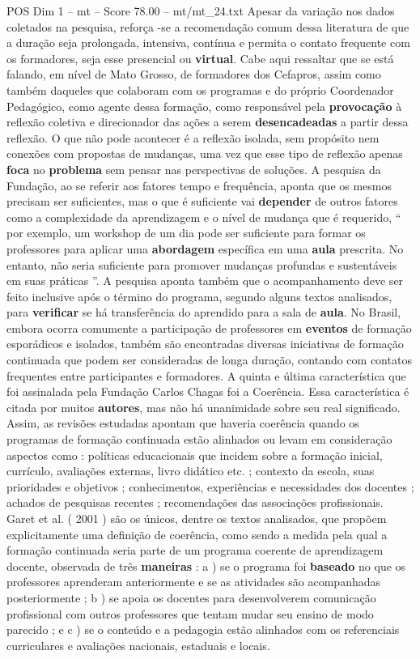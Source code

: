 \begin{textsample}{POS Dim 1 – mt – Score 78.00 – mt/mt\_24.txt}
Apesar da variação nos dados coletados na pesquisa, reforça -se a recomendação comum dessa literatura de que a duração seja prolongada, intensiva, contínua e permita o contato frequente com os formadores, seja esse presencial ou \textbf{virtual}.
Cabe aqui ressaltar que se está falando, em nível de Mato Grosso, de formadores dos Cefapros, assim como também daqueles que colaboram com os programas e do próprio Coordenador Pedagógico, como agente dessa formação, como responsável pela \textbf{provocação} à reflexão coletiva e direcionador das ações a serem \textbf{desencadeadas} a partir dessa reflexão.
O que não pode acontecer é a reflexão isolada, sem propósito nem conexões com propostas de mudanças, uma vez que esse tipo de reflexão apenas \textbf{foca} no \textbf{problema} sem pensar nas perspectivas de soluções.
A pesquisa da Fundação, ao se referir aos fatores tempo e frequência, aponta que os mesmos precisam ser suficientes, mas o que é suficiente vai \textbf{depender} de outros fatores como a complexidade da aprendizagem e o nível de mudança que é requerido, “ por exemplo, um workshop de um dia pode ser suficiente para formar os professores para aplicar uma \textbf{abordagem} específica em uma \textbf{aula} prescrita.
No entanto, não seria suficiente para promover mudanças profundas e sustentáveis em suas práticas ”.
A pesquisa aponta também que o acompanhamento deve ser feito inclusive após o término do programa, segundo alguns textos analisados, para \textbf{verificar} se há transferência do aprendido para a sala de \textbf{aula}.
No Brasil, embora ocorra comumente a participação de professores em \textbf{eventos} de formação esporádicos e isolados, também são encontradas diversas iniciativas de formação continuada que podem ser consideradas de longa duração, contando com contatos frequentes entre participantes e formadores.
A quinta e última característica que foi assinalada pela Fundação Carlos Chagas foi a Coerência.
Essa característica é citada por muitos \textbf{autores}, mas não há unanimidade sobre seu real significado.
Assim, as revisões estudadas apontam que haveria coerência quando os programas de formação continuada estão alinhados ou levam em consideração aspectos como : políticas educacionais que incidem sobre a formação inicial, currículo, avaliações externas, livro didático etc. ; contexto da escola, suas prioridades e objetivos ; conhecimentos, experiências e necessidades dos docentes ; achados de pesquisas recentes ; recomendações das associações profissionais.
Garet et al. ( 2001 ) são os únicos, dentre os textos analisados, que propõem explicitamente uma definição de coerência, como sendo a medida pela qual a formação continuada seria parte de um programa coerente de aprendizagem docente, observada de três \textbf{maneiras} : a ) se o programa foi \textbf{baseado} no que os professores aprenderam anteriormente e se as atividades são acompanhadas posteriormente ; b ) se apoia os docentes para desenvolverem comunicação profissional com outros professores que tentam mudar seu ensino de modo parecido ; e c ) se o conteúdo e a pedagogia estão alinhados com os referenciais curriculares e avaliações nacionais, estaduais e locais.

\end{textsample}
